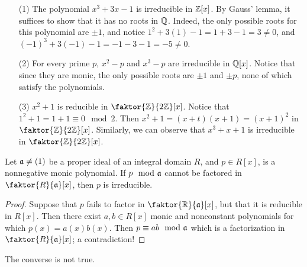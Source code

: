 \begin{example}\label{example_7.4}
    \begin{enumerate}
        \item[(1)] The polynomial $x^3+3x-1$ is irreducible in  $\mathbb{Z}[x]$. By
            Gauss' lemma, it suffices to show that it has no roots in $\mathbb{Q}$.
            Indeed, the only possible roots for this polynomial are  $\pm{1}$,
            and notice $1^2+3(1)-1=1+3-1=3 \neq 0$, and
            $(-1)^3+3(-1)-1=-1-3-1=-5 \neq 0$.

        \item[(2)] For every prime $p$,  $x^2-p$ and  $x^3-p$ are irreducible in
             $\mathbb{Q}[x]$. Notice that since they are monic, the only possible roots
             are $\pm{1}$ and $\pm{p}$, none of which satisfy the polynomials.

         \item[(3)] $x^2+1$ is reducible in  $\faktor{\Z}{2\Z}[x]$. Notice that
             $1^2+1=1+1 \equiv 0 \mod{2}$. Then $x^2+1=(x+t)(x+1)=(x+1)^2$ in
             $\faktor{\Z}{2\Z}[x]$. Similarly, we can observe that $x^3+x+1$ is
             irreducible in  $\faktor{\Z}{2\Z}[x]$.
    \end{enumerate}
\end{example}

\begin{lemma}\label{lemma_7.3.3}
    Let $\mathfrak{a} \neq (1)$ be a proper ideal of an integral domain $R$, and  $p \in
    R[x]$, is a nonnegative monic polynomial. If $p \mod{\mathfrak{a}}$ cannot be factored
    in $\faktor{R}{\af}[x]$, then $p$ is irreducible.
\end{lemma}
\begin{proof}
    Suppose that $p$ fails to factor in  $\faktor{\R}{\af}[x]$, but that it is
    reducible in $R[x]$. Then there exist $a,b \in R[x]$ monic and nonconstant
    polynomials for which $p(x)=a(x)b(x)$. Then $p \equiv ab \mod{\mathfrak{a}}$ which is a
    factorization in $\faktor{R}{\af}[x]$; a contradiction!
\end{proof}
\begin{remark}
    The converse is not true.
\end{remark}

